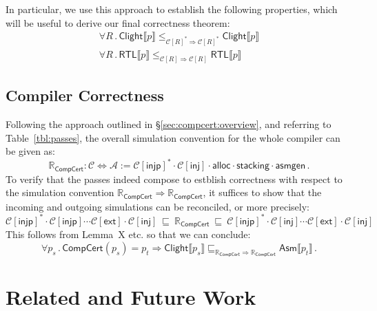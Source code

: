 \documentclass[acmsmall,timestamp,review,anonymous]{acmart}
\newcommand{\kw}[1]{\ensuremath{ \mathsf{#1} }}
\begin{document}
In particular,
we use this approach to establish the following properties,
which will be useful to derive our final correctness theorem:
\begin{gather}
    \forall R \,.\,
      \kw{Clight} \llbracket p \rrbracket
        \le_{\mathcal{C}[R]^* \Rightarrow \mathcal{C}[R]^*}
      \kw{Clight} \llbracket p \rrbracket
      \label{eqn:clight}
      \\
    \forall R \,.\,
      \kw{RTL} \llbracket p \rrbracket
        \le_{\mathcal{C}[R] \Rightarrow \mathcal{C}[R]}
      \kw{RTL} \llbracket p \rrbracket
      \label{eqn:rtl}
\end{gather}


\subsection{Compiler Correctness} %

Following the approach outlined in \S\ref{sec:compcert:overview},
and referring to Table~\ref{tbl:passes},
the overall simulation convention for the whole compiler
can be given as:
\[
  \mathbb{R}_\kw{CompCert} : \mathcal{C} \Leftrightarrow \mathcal{A} :=
    \mathcal{C}[\kw{injp}]^* \cdot
    \mathcal{C}[\kw{inj}] \cdot
    \kw{alloc} \cdot
    \kw{stacking} \cdot
    \kw{asmgen} \,.
\]
To verify that the passes indeed compose to
estblish correctness with respect to the simulation convention
$\mathbb{R}_\kw{CompCert} \Rightarrow \mathbb{R}_\kw{CompCert}$,
it suffices to show that
the incoming and outgoing simulations can be reconciled,
or more precisely:
\[
    \mathcal{C}[\kw{injp}]^* \cdot
    \mathcal{C}[\kw{injp}] \cdots
    \mathcal{C}[\kw{ext}] \cdot
    \mathcal{C}[\kw{inj}]
    \: \sqsubseteq \:
    \mathbb{R}_\kw{CompCert}
    \: \sqsubseteq \:
    \mathcal{C}[\kw{injp}]^* \cdot
    \mathcal{C}[\kw{inj}] \cdots
    \mathcal{C}[\kw{ext}] \cdot
    \mathcal{C}[\kw{inj}] 
\]
This follows from Lemma~X etc.
so that we can conclude:
\[
    \forall p_s \,.\,
      \kw{CompCert}(p_s) = p_t \Rightarrow
      \kw{Clight} \llbracket p_s \rrbracket
      \sqsubseteq_{\mathbb{R}_\kw{CompCert} \Rightarrow
                   \mathbb{R}_\kw{CompCert}}
      \kw{Asm} \llbracket p_t \rrbracket \,.
\]





\section{Related and Future Work} %
\end{document}
